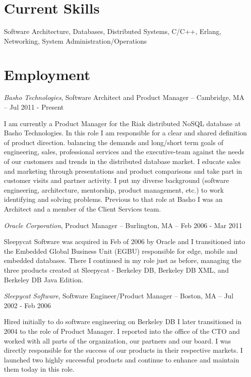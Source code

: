\documentclass[letterpaper]{article}
\renewenvironment{itemize}{
  \begin{list}{}{
    \setlength{\leftmargin}{1.5em}
  }
}{
  \end{list}
}
\begin{document}
\section*{Current Skills}

\begin{itemize}
\item Software Architecture, Databases, Distributed Systems, C/C++, Erlang,
  Networking, System Administration/Operations
\end{itemize}


\section*{Employment}

\begin{itemize}
\item {\it Basho Technologies}, Software Architect and Product Manager -- Cambridge, MA -- Jul 2011 - Present

I am currently a Product Manager for the Riak distributed NoSQL database at
Basho Technologies. In this role I am responsible for a clear and shared
definition of product direction.
balancing the demands and
long/short term goals of engineering, sales, professional services and the
executive-team against the needs of our customers and trends in the distributed
database market. I educate sales and marketing through presentations and
product comparisons and take part in customer visits and partner activity. I
put my diverse background (software engineering, architecture, mentorship,
product management, etc.) to work identifying and solving problems. Previous to
that role at Basho I was an Architect and a member of the Client Services team.

\item {\it Oracle Corporation}, Product Manager -- Burlington, MA -- Feb 2006 - Mar 2011

Sleepycat Software was acquired in Feb of 2006 by Oracle and I transitioned
into the Embedded Global Business Unit (EGBU) responsible for edge, mobile and
embedded databases. There I continued in my role just as before, managing the
three products created at Sleepycat - Berkeley DB, Berkeley DB XML, and
Berkeley DB Java Edition.

\item {\it Sleepycat Software}, Software Engineer/Product Manager -- Boston, MA -- Jul 2002 - Feb 2006

Hired initially to do software engineering on Berkeley DB I later transitioned
in 2004 to the role of Product Manager. I reported into the office of the CTO
and worked with all parts of the organization, our partners and our board. I
was directly responsible for the success of our products in their respective
markets. I launched two highly successful products and continue to enhance and
maintain them today in this role.


\end{itemize}
\end{document}
